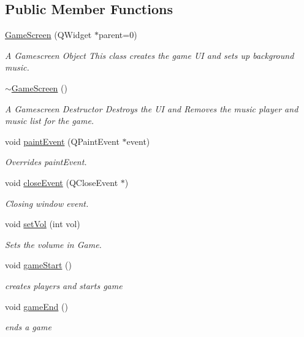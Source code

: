 \subsection*{Public Member Functions}
\begin{DoxyCompactItemize}
\item 
\hyperlink{class_game_screen_a61ac084a564d45be53337cc364214a60}{Game\-Screen} (Q\-Widget $\ast$parent=0)
\begin{DoxyCompactList}\small\item\em A Gamescreen Object This class creates the game U\-I and sets up background music. \end{DoxyCompactList}\item 
\hyperlink{class_game_screen_a0d25dfce42d72954aab40dbccbf1a0b1}{$\sim$\-Game\-Screen} ()
\begin{DoxyCompactList}\small\item\em A Gamescreen Destructor Destroys the U\-I and Removes the music player and music list for the game. \end{DoxyCompactList}\item 
void \hyperlink{class_game_screen_ab954f12aa342e80cb55dd4e2b8d3afeb}{paint\-Event} (Q\-Paint\-Event $\ast$event)
\begin{DoxyCompactList}\small\item\em Overrides paint\-Event. \end{DoxyCompactList}\item 
void \hyperlink{class_game_screen_af2a5d4c707d0d0f47201eec498b77bd6}{close\-Event} (Q\-Close\-Event $\ast$)
\begin{DoxyCompactList}\small\item\em Closing window event. \end{DoxyCompactList}\item 
void \hyperlink{class_game_screen_aeb56964e385b3f4b0fb8cdab4b943303}{set\-Vol} (int vol)
\begin{DoxyCompactList}\small\item\em Sets the volume in Game. \end{DoxyCompactList}\item 
void \hyperlink{class_game_screen_ab72ef48944870ff77a2273ab20536436}{game\-Start} ()
\begin{DoxyCompactList}\small\item\em creates players and starts game \end{DoxyCompactList}\item 
void \hyperlink{class_game_screen_aeb3e0a8afcd161e720ce3fc7b9b800a9}{game\-End} ()
\begin{DoxyCompactList}\small\item\em ends a game \end{DoxyCompactList}\end{DoxyCompactItemize}
